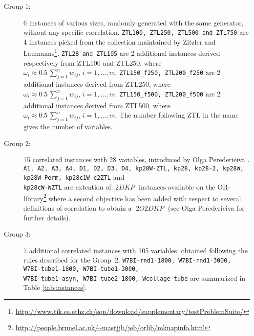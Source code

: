 \documentclass[11pt]{amsart}
\title{}
\author{}
\DeclareMathOperator{\BDKP}{2\mathit{DKP}}
\DeclareMathOperator{\BOBDKP}{2\mathit{O}2\mathit{DKP}}
\begin{document}
\maketitle

%
\begin{description}
\item[Group 1:]  6 instances of various sizes, randomly generated with the same generator, without any specific correlation. \texttt{ZTL100, ZTL250, ZTL500 and ZTL750} are 4 instances picked from the collection maintained by Zitzler and Laumanns\footnote{\url{http://www.tik.ee.ethz.ch/sop/download/supplementary/testProblemSuite/}}.
\texttt{ZTL28 and ZTL105} are 2 additional instances derived respectively from ZTL100 and ZTL250, where 
$\omega_i \approx 0.5 \, \sum_{j=1}^n{w_{ij}}, \, i=1,\dots,m$.
\texttt{ZTL150\_f250, ZTL200\_f250} are 2 additional instances derived from ZTL250, where 
$\omega_i \approx 0.5 \, \sum_{j=1}^n{w_{ij}}, \, i=1,\dots,m$.
\texttt{ZTL150\_f500, ZTL200\_f500} are 2 additional instances derived from ZTL500, where 
$\omega_i \approx 0.5 \, \sum_{j=1}^n{w_{ij}}, \, i=1,\dots,m$.
The number following ZTL in the name gives the number of variables.
%
\item[Group 2:] 15 correlated instances with 28 variables, introduced by Olga Perederieiva \cite{Perederieiva:2011a}. \texttt{A1, A2, A3, A4, D1, D2, D3, D4, kp28W-ZTL, kp28,  kp28-2, kp28W, kp28W-Perm, kp28c1W-c2ZTL} and \\ \texttt{kp28cW-WZTL} are extention of $\BDKP$ instances available on the OR-library\footnote{\url{http://people.brunel.ac.uk/~mastjjb/jeb/orlib/mknapinfo.html}} where a second objective has been added with respect to several definitions of correlation to obtain a $\BOBDKP$ (see Olga Perederieiva \cite{Perederieiva:2011a} for further details).
%
\item[Group 3:] 7 additional correlated instances with 105 variables, obtained following the rules described for the Group~2. \texttt{W7BI-rnd1-1800, W7BI-rnd1-3000, W7BI-tube1-1800, W7BI-tube1-3000,} \\ \texttt{W7BI-tube1-asyn, W7BI-tube2-1800, Wcollage-tube} are summarized in Table \ref{tab:instances}. 
\end{description}
\end{document}
